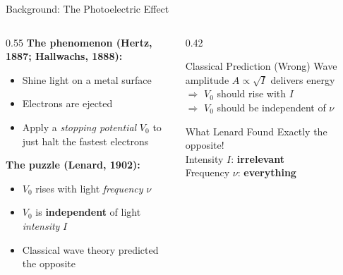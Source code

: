 \documentclass[aspectratio=169,12pt]{beamer}
\begin{document}
\begin{frame}{Background: The Photoelectric Effect}

\begin{columns}[T]
\begin{column}{0.55\textwidth}
\textbf{The phenomenon (Hertz, 1887; Hallwachs, 1888):}
\begin{itemize}
  \item Shine light on a metal surface
  \item Electrons are ejected
  \item Apply a \emph{stopping potential} $V_0$ to just halt the
    fastest electrons
\end{itemize}

\bigskip
\textbf{The puzzle (Lenard, 1902):}
\begin{itemize}
  \item[\color{datared}$\bullet$] $V_0$ rises with light \emph{frequency} $\nu$
  \item[\color{datared}$\bullet$] $V_0$ is \textbf{independent} of light
    \emph{intensity} $I$
  \item[\color{datared}$\bullet$] Classical wave theory predicted the opposite
\end{itemize}
\end{column}
\begin{column}{0.42\textwidth}
\begin{block}{Classical Prediction (Wrong)}
Wave amplitude $A \propto \sqrt{I}$ delivers energy\\
$\Rightarrow$ $V_0$ should rise with $I$\\
$\Rightarrow$ $V_0$ should be independent of $\nu$
\end{block}

\bigskip
\begin{alertblock}{What Lenard Found}
Exactly the opposite!\\[4pt]
Intensity $I$: \textbf{irrelevant}\\
Frequency $\nu$: \textbf{everything}
\end{alertblock}
\end{column}
\end{columns}

\end{frame}
\end{document}
